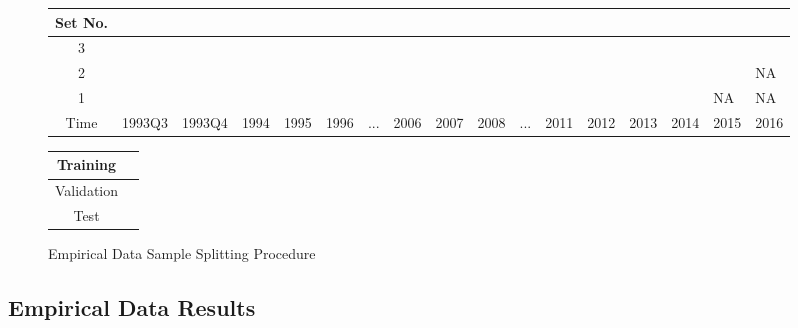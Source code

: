 \documentclass[a4paper, table]{article}
\begin{document}
\begin{figure}
	\begin{center}
		\begin{tabular}{|c|p{0.50cm}p{0.50cm}p{0.50cm}p{0.50cm}p{0.50cm}p{0.50cm}p{0.50cm}p{0.50cm}p{0.50cm}p{0.50cm}p{0.50cm}p{0.50cm}p{0.50cm}p{0.50cm}p{0.50cm}p{0.50cm}|}
			\hline
			Set No. &&&&&&&&&&&&&&&& \\
			\hline
			3 & \cellcolor{cyan} & \cellcolor{cyan} & \cellcolor{cyan} & \cellcolor{cyan} & \cellcolor{cyan} & \cellcolor{cyan} & \cellcolor{cyan} & \cellcolor{cyan} &
			\cellcolor{pink} & \cellcolor{pink} & \cellcolor{pink} & \cellcolor{pink} & \cellcolor{pink} & \cellcolor{pink} & \cellcolor{pink} & \cellcolor{olive} \\
			2 & \cellcolor{cyan} & \cellcolor{cyan} & \cellcolor{cyan} & \cellcolor{cyan} & \cellcolor{cyan} & \cellcolor{cyan} & \cellcolor{cyan} &
			\cellcolor{pink} & \cellcolor{pink} & \cellcolor{pink} & \cellcolor{pink} & \cellcolor{pink} & \cellcolor{pink} & \cellcolor{pink} & 	
			\cellcolor{olive} & NA \\
			1 & \cellcolor{cyan} & \cellcolor{cyan} & \cellcolor{cyan} & \cellcolor{cyan} & \cellcolor{cyan} & \cellcolor{cyan} &
			\cellcolor{pink} & \cellcolor{pink} & \cellcolor{pink} & \cellcolor{pink} & \cellcolor{pink} & \cellcolor{pink} & \cellcolor{pink} & \cellcolor{olive} & NA & NA \\
			\hline
			Time & 1993Q3 & 1993Q4 & 1994 & 1995 & 1996 & ... & 2006 & 2007 & 2008 & ... & 2011 & 2012 & 2013 & 2014 & 2015 & 2016 \\
			\hline
		\end{tabular}
		\medskip
		\begin{tabular}{|c|p{0.60cm}|}
			\hline
			Training & \cellcolor{cyan} \\
			\hline
			Validation & \cellcolor{pink} \\
			\hline
			Test & \cellcolor{olive} \\
			\hline
		\end{tabular}
	\end{center}
	\caption{Empirical Data Sample Splitting Procedure}
	\label{emp_sample_split_diag}
\end{figure}

\subsection{Empirical Data Results}
\end{document}
